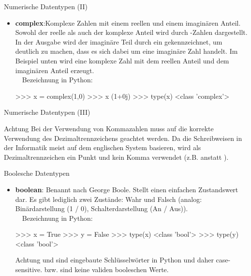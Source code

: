         
        \begin{frame}[fragile]{Numerische Datentypen (II)}
        
            \begin{itemize}
                \item \textbf{complex}:Komplexe Zahlen mit einem reellen und einem imaginären Anteil. Sowohl der reelle als auch der komplexe Anteil wird durch -Zahlen dargestellt. In der Ausgabe wird der imaginäre Teil durch ein  gekennzeichnet, um deutlich zu machen, dass es sich dabei um eine imaginäre Zahl handelt. Im Beispiel unten wird eine komplexe Zahl mit dem reellen Anteil  und dem imaginären Anteil  erzeugt. \\~\
                Bezeichnung in Python: \textbf{}
\begin{pyconcode}
>>> x = complex(1,0)
>>> x
(1+0j)
>>> type(x)
<class 'complex'>
\end{pyconcode}
            \end{itemize}
            
        \end{frame}
        
         \begin{frame}[fragile]{Numerische Datentypen (III)}
            \begin{alertblock}{Achtung}
                Bei der Verwendung von Kommazahlen muss auf die korrekte Verwendung des Dezimaltrennzeichens geachtet werden. Da die Schreibweisen in der Informatik meist auf dem englischen System basieren, wird als Dezimaltrennzeichen ein Punkt und kein Komma verwendet (z.B.  anstatt ).
            \end{alertblock}
         \end{frame}
        
        
        \begin{frame}[fragile]{Boolesche Datentypen}
        
            \begin{itemize}
                \item \textbf{boolean}: Benannt nach George Boole. Stellt einen einfachen Zustandswert dar. Es gibt lediglich zwei Zustände: Wahr und Falsch (analog: Binärdarstellung (1 / 0), Schalterdarstellung (An / Aus)). \\~\
                Bezeichnung in Python: \textbf{}
\begin{pyconcode}
>>> x = True
>>> y = False
>>> type(x)
<class 'bool'>
>>> type(y)
<class 'bool'>
\end{pyconcode}

            \begin{alertblock}{Achtung}
                 und  sind eingebaute Schlüsselwörter in Python und daher case-sensitive.  bzw.  sind keine validen booleschen Werte.
            \end{alertblock}
            
            \end{itemize}
            
        \end{frame}
        
